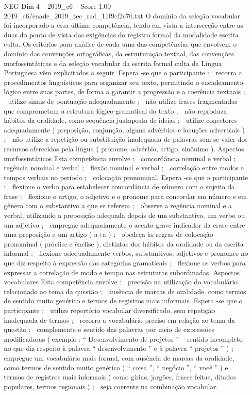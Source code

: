 \begin{textsample}{NEG Dim 4 – 2019\_c6 – Score 1.00 – 2019\_c6/enade\_2019\_tec\_rad\_11f9cf2c70.txt}
O domínio da seleção vocabular foi incorporado a essa última competência, tendo em vista a intersecção entre as duas do ponto de vista das exigências do registro formal da modalidade escrita culta.
Os critérios para análise de cada uma das competências que envolvem o domínio das convenções ortográficas, da estruturação textual, das convenções morfossintáticas e da seleção vocabular da escrita formal culta da Língua Portuguesa vêm explicitados a seguir.
Espera -se que o participante :  recorra a procedimentos linguísticos para organizar seu texto, permitindo o encadeamento lógico entre suas partes, de forma a garantir a progressão e a coerência textuais ;  utilize sinais de pontuação adequadamente ;  não utilize frases fragmentadas que comprometam a estrutura lógico-gramatical do texto ;  não reproduza hábitos da oralidade, como sequência justaposta de ideias ;  utilize conectores adequadamente ( preposição, conjunção, alguns advérbios e locuções adverbiais ) ;  não utilize a repetição ou substituição inadequada de palavras sem se valer dos recursos oferecidos pela língua ( pronome, advérbio, artigo, sinônimo ).
Aspectos morfossintáticos Esta competência envolve :  concordância nominal e verbal ;  regência nominal e verbal ;  flexão nominal e verbal ;  correlação entre modos e tempos verbais no período ;  colocação pronominal.
Espera -se que o participante :  flexione o verbo para estabelecer concordância de número com o sujeito da frase ;  flexione o artigo, o adjetivo e o pronome para concordar em número e em gênero com o substantivo a que se referem ;  observe a regência nominal e a verbal, utilizando a preposição adequada depois de um substantivo, um verbo ou um adjetivo ;  empregue adequadamente o acento grave indicador da crase entre uma preposição e um artigo ( a+a ) ;  obedeça às regras de colocação pronominal ( próclise e ênclise ), distintas dos hábitos da oralidade ou da escrita informal ;  flexione adequadamente verbos, substantivos, adjetivos e pronomes no que diz respeito à expressão das categorias gramaticais ;  flexione os verbos para expressar a correlação de modo e tempo nas estruturas subordinadas.
Aspectos vocabulares Esta competência envolve :  precisão na utilização do vocabulário relacionado ao tema da questão ;  ausência de marcas de oralidade, como termos de sentido muito genérico e termos de registros mais informais.
Espera -se que o participante :  utilize repertório vocabular diversificado, sem repetição inadequada de termos ;  recorra a vocabulário preciso em relação ao tema da questão ;  complemente o sentido das palavras por meio de expressões modificadoras ( exemplo : “ Desenvolvimento de projetos ” – sentido incompleto no que diz respeito à palavra “ desenvolvimento ” e à palavra “ projetos ” ) ;  empregue um vocabulário mais formal, com ausência de marcas da oralidade, como termos de sentido muito genérico ( “ coisa ”, “ negócio ”, “ você ” ) e termos de registros mais informais ( como gírias, jargões, frases feitas, ditados populares, termos regionais ) ;  seja coerente na combinação vocabular.

\end{textsample}
